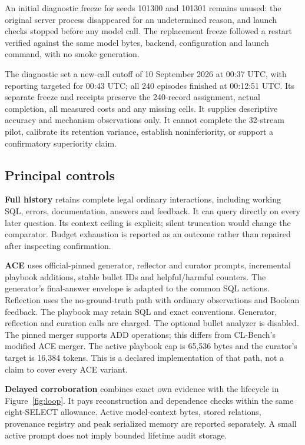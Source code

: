 \documentclass[10pt,twocolumn]{article}
\begin{document}
An initial diagnostic freeze for seeds 101300 and 101301 remains unused: the
original server process disappeared for an undetermined reason, and launch
checks stopped before any model call. The replacement freeze followed a restart
verified against the same model bytes, backend, configuration and launch command,
with no smoke generation.

The diagnostic set a new-call cutoff of 10 September 2026 at 00:37 UTC, with
reporting targeted for 00:43 UTC; all 240 episodes finished at 00:12:51 UTC.
Its separate freeze and receipts preserve the
240-record assignment, actual completion, all measured costs and any missing
cells. It supplies descriptive accuracy and mechanism observations only. It
cannot complete the 32-stream pilot, calibrate its retention variance, establish
noninferiority, or support a confirmatory superiority claim.

\subsection{Principal controls}
\textbf{Full history} retains complete legal ordinary interactions, including
working SQL, errors, documentation, answers and feedback. It can query directly
on every later question. Its context ceiling is explicit; silent truncation
would change the comparator. Budget exhaustion is reported as an outcome rather
than repaired after inspecting confirmation.

\textbf{ACE} uses official-pinned generator, reflector and curator prompts,
incremental playbook additions, stable bullet IDs and helpful/harmful counters.
The generator's final-answer envelope is adapted to the common SQL actions.
Reflection uses the no-ground-truth path with ordinary observations and Boolean
feedback. The playbook may retain SQL and exact conventions. Generator,
reflection and curation calls are charged. The optional bullet analyzer is
disabled. The pinned merger supports ADD operations; this differs from
CL-Bench's modified ACE merger. The active playbook cap is 65,536 bytes and the
curator's target is 16,384 tokens. This is a declared implementation of that
path, not a claim to cover every ACE variant.

\textbf{Delayed corroboration} combines exact own evidence with the lifecycle
in Figure~\ref{fig:loop}. It pays reconstruction and dependence checks within
the same eight-SELECT allowance. Active model-context bytes, stored relations,
provenance registry and peak serialized memory are reported separately. A small
active prompt does not imply bounded lifetime audit storage.
\end{document}

